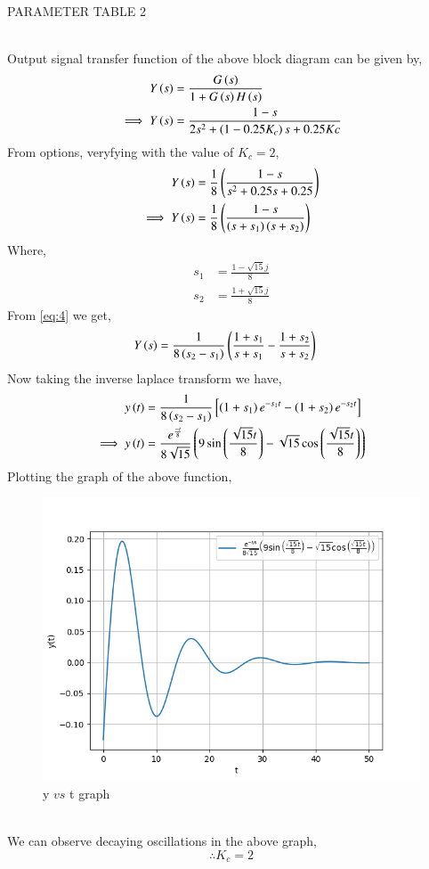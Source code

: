 \documentclass[journal,12pt,twocolumn]{IEEEtran}
\theoremstyle{remark}
\begin{document}
\begin{table}[ht]
    \centering
    
    \caption{PARAMETER TABLE 2}
    \label{tab:ch.45.2}
\end{table} \\
Output signal transfer function of the above block diagram can be given by,
\begin{align}
     Y\left(s\right) &= \frac{G\left(s\right)}{1+G\left(s\right)H\left(s\right)}    \\
    \implies Y\left(s\right) &= \frac{1-s}{2s^2 + \left(1-0.25K_c\right)s + 0.25Kc}
\end{align}
From options, veryfying with the value of $K_c=2$, 
\begin{align}
    Y\left(s\right) &= \frac{1}{8}\left(\frac{1-s}{s^2+0.25s+0.25}\right)   \\
    \implies Y\left(s\right) &= \frac{1}{8}\left(\frac{1-s}{\left(s+s_1\right)\left(s+s_2\right)}\right) \label{eq:4}
\end{align}
Where,
\begin{align}
    s_1 &= \frac{1-\sqrt{15}j}{8}   \\
    s_2 &= \frac{1+\sqrt{15}j}{8}   
\end{align}
From \eqref{eq:4} we get,
\begin{align}
    Y\left(s\right) &= \frac{1}{8\left(s_2-s_1\right)}\left(\frac{1+s_1}{s+s_1}-\frac{1+s_2}{s+s_2}\right)
\end{align}
Now taking the inverse laplace transform we have,
\begin{align}
    y\left(t\right) &= \frac{1}{8\left(s_2-s_1\right)} \left [\left(1+s_1\right)e^{-s_1t}-\left(1+s_2\right)e^{-s_2t} \right ]  \\
    \implies y\left(t\right) &= \frac{e^{\frac{-t}{8}}}{8\sqrt{15}}\left(9\sin \left(\frac{\sqrt{15}t}{8}\right) - \sqrt{15}\cos \left(\frac{\sqrt{15}t}{8}\right)\right)
\end{align}
Plotting the graph of the above function,   \\
\begin{figure}[ht]
    \centering
    \includegraphics[width=\columnwidth]{figs/b.png}
    \caption{y $vs$ t graph}
    \label{fig:ch.45.2}
\end{figure}    \\
We can observe decaying oscillations in the above graph,    \\
$$\therefore K_c=2$$
\end{document}
